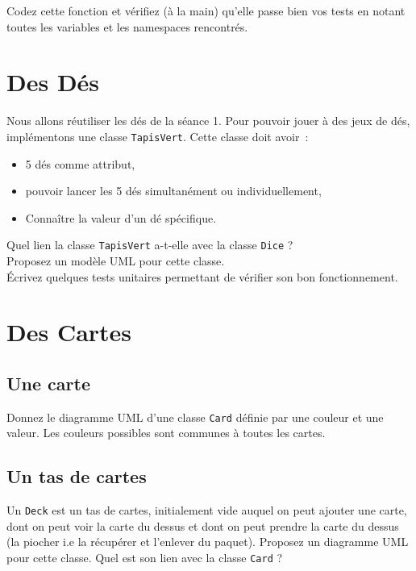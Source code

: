 \documentclass[12pt]{article}
\begin{document}
Codez cette fonction et vérifiez (à la main) qu'elle passe bien vos tests en notant toutes les variables et les namespaces rencontrés.

\section{Des Dés}

Nous allons réutiliser les dés de la séance 1. Pour pouvoir jouer à des jeux de dés, implémentons une classe
\verb|TapisVert|. Cette classe doit avoir~:
\begin{itemize}
	\item 5 dés comme attribut,
	\item pouvoir lancer les 5 dés simultanément ou individuellement,
	\item Connaître la valeur d'un dé spécifique.
\end{itemize}

Quel lien la classe \verb|TapisVert| a-t-elle avec la classe \verb|Dice| ?\\
Proposez un modèle UML pour cette classe.\\
Écrivez quelques tests unitaires permettant de vérifier son bon fonctionnement.\\

\section{Des Cartes}
\subsection{Une carte}
Donnez le diagramme UML d'une classe \verb|Card| définie par une couleur et une valeur. Les couleurs possibles sont communes à
toutes les cartes.

\subsection{Un tas de cartes}
Un \verb|Deck| est un tas de cartes, initialement vide auquel on peut ajouter une carte, dont on peut voir la carte du
dessus et dont on peut prendre la carte du dessus (la piocher i.e la récupérer et l'enlever du paquet). Proposez un
diagramme UML pour cette classe. Quel est son lien avec la classe \verb|Card| ?
\end{document}
